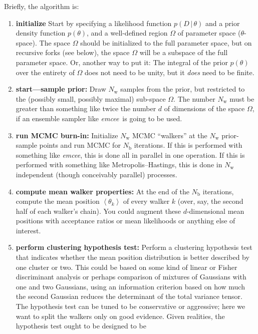 \documentclass[12pt]{article}
\newcommand{\project}[1]{\textsl{#1}}
\newcommand{\emcee}{\project{emcee}}
\newcommand{\mean}[1]{\left<{#1}\right>}
\newcommand{\given}{\,|\,}
\newcommand{\data}{D}
\newcommand{\pars}{\theta}
\newcommand{\parspace}{\Omega}
\newcommand{\nwalker}{N_{\mathrm{w}}}
\newcommand{\ndim}{d}
\newcommand{\nburn}{N_{\mathrm{b}}}
\begin{document}
Briefly, the algorithm is:
\begin{enumerate}
\item \textbf{initialize} Start by specifying a likelihood function
  $p(\data\given\pars)$ and a prior density function $p(\pars)$, and a
  well-defined region $\parspace$ of parameter space ($\pars$-space).
  The space $\parspace$ should be initialized to the full parameter
  space, but on recursive forks (see below), the space $\parspace$
  will be a subspace of the full parameter space.  Or, another way to
  put it: The integral of the prior $p(\pars)$ over the entirety of
  $\parspace$ does not need to be unity, but it \emph{does} need to be
  finite.
\item \label{step:start}\textbf{start---sample prior:} Draw $\nwalker$
  samples from the prior, but restricted to the (possibly small,
  possibly maximal) sub-space $\parspace$.  The number $\nwalker$ must
  be greater than something like twice the number $\ndim$ of
  dimensions of the space $\parspace$, if an ensemble sampler like
  \emcee\ is going to be used.
\item \textbf{run MCMC burn-in:} Initialize $\nwalker$ MCMC
  ``walkers'' at the $\nwalker$ prior-sample points and run MCMC for
  $\nburn$ iterations.  If this is performed with something like
  \emcee, this is done all in parallel in one operation.  If this is
  performed with something like Metropolis--Hastings, this is done in
  $\nwalker$ independent (though conceivably parallel) processes.
\item \textbf{compute mean walker properties:} At the end of the
  $\nburn$ iterations, compute the mean position $\mean{\pars_k}$ of
  every walker $k$ (over, say, the second half of each walker's
  chain).  You could augment these $\ndim$-dimensional mean positions
  with acceptance ratios or mean likelihoods or anything else of
  interest.
\item \label{step:test}\textbf{perform clustering hypothesis test:}
  Perform a clustering hypothesis test that indicates whether the mean
  position distribution is better described by one cluster or two.
  This could be based on some kind of linear or Fisher discriminant
  analysis or perhaps comparison of mixtures of Gaussians with one and
  two Gaussians, using an information criterion based on how much the
  second Gaussian reduces the determinant of the total variance
  tensor.  The hypothesis test can be tuned to be conservative or
  aggressive; here we want to split the walkers only on good evidence.
  Given realities, the hypothesis test ought to be designed to be

\end{enumerate}
\end{document}
